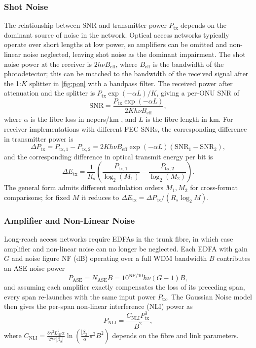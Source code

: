 \documentclass[12pt,a4paper]{article}
\begin{document}
\subsubsection{Shot Noise}
The relationship between SNR and transmitter power \(P_\mathrm{tx}\) depends on the dominant source of noise in the network. Optical access networks typically operate over short lengths at low power, so amplifiers can be omitted and non-linear noise neglected, leaving shot noise as the dominant impairment. The shot noise power at the receiver is \(2h\nu B_\mathrm{eff}\), where \(B_\mathrm{eff}\) is the bandwidth of the photodetector; this can be matched to the bandwidth of the received signal after the 1:\(K\) splitter in \cref{fig:pon} with a bandpass filter. The received power after attenuation and the splitter is \(P_\mathrm{tx}\exp(-\alpha L)/K\), giving a per-ONU SNR of
\begin{equation}
    \mathrm{SNR} = \frac{P_\mathrm{tx} \exp(-\alpha L)}{2Kh\nu B_\mathrm{eff}},
\end{equation}
where \(\alpha\) is the fibre loss in nepers/km , and \(L\) is the fibre length in km. For receiver implementations with different FEC SNRs, the corresponding difference in transmitter power is
\begin{equation}
    \Delta P_\mathrm{tx} = P_\mathrm{tx,1} - P_\mathrm{tx,2} = 2Kh\nu B_\mathrm{eff}\exp(-\alpha L)(\mathrm{SNR}_1 - \mathrm{SNR}_2),
\end{equation}
and the corresponding difference in optical transmit energy per bit is
\begin{equation}
    \Delta E_\mathrm{tx} = \frac{1}{R_s}\left(\frac{P_\mathrm{tx,1}}{\log_2(M_1)} - \frac{P_\mathrm{tx,2}}{\log_2(M_2)}\right).
    \label{eq:tx_energy}
\end{equation}
The general form admits different modulation orders \(M_1, M_2\) for cross-format comparisons; for fixed \(M\) it reduces to \(\Delta E_\mathrm{tx} = \Delta P_\mathrm{tx}/(R_s \log_2 M)\).

\subsubsection{Amplifier and Non-Linear Noise}
Long-reach access networks require EDFAs in the trunk fibre, in which case amplifier and non-linear noise can no longer be neglected. Each EDFA with gain \(G\) and noise figure \(\mathrm{NF}\) (dB) operating over a full WDM bandwidth \(B\) contributes an ASE noise power
\begin{equation}
    P_\mathrm{ASE} = N_\mathrm{ASE}B = 10^{\mathrm{NF}/10}h\nu (G-1)B,
\end{equation}
and assuming each amplifier exactly compensates the loss of its preceding span, every span re-launches with the same input power \(P_\mathrm{tx}\). The Gaussian Noise model \cite{poggiolini2012gn} then gives the per-span non-linear interference (NLI) power as
\begin{equation}
    P_\mathrm{NLI} = \frac{C_\mathrm{NLI} P_\mathrm{tx}^3}{B^2},
\end{equation}
where \(C_\mathrm{NLI} = \frac{8 \gamma^2 L_\mathrm{eff}^2 \alpha}{27\pi|\beta_2|}\ln(\frac{|\beta_2|}{\alpha}\pi^2B^2)\) depends on the fibre and link parameters.
\end{document}
